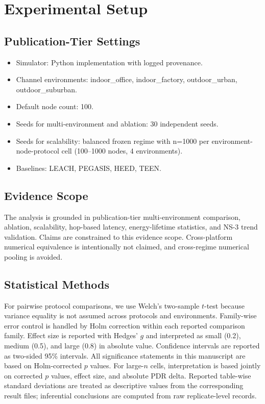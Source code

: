 \documentclass[sensors,article,submit,moreauthors,pdftex]{Definitions/mdpi}
\begin{document}
\section{Experimental Setup}
\subsection{Publication-Tier Settings}
\begin{itemize}
\item Simulator: Python implementation with logged provenance.
\item Channel environments: indoor\_office, indoor\_factory, outdoor\_urban, outdoor\_suburban.
\item Default node count: 100.
\item Seeds for multi-environment and ablation: 30 independent seeds.
\item Seeds for scalability: balanced frozen regime with n=1000 per environment-node-protocol cell (100--1000 nodes, 4 environments).
\item Baselines: LEACH, PEGASIS, HEED, TEEN.
\end{itemize}

\subsection{Evidence Scope}
The analysis is grounded in publication-tier multi-environment comparison, ablation, scalability, hop-based latency, energy-lifetime statistics, and NS-3 trend validation. Claims are constrained to this evidence scope. Cross-platform numerical equivalence is intentionally not claimed, and cross-regime numerical pooling is avoided.

\subsection{Statistical Methods}
For pairwise protocol comparisons, we use Welch's two-sample $t$-test because variance equality is not assumed across protocols and environments. Family-wise error control is handled by Holm correction within each reported comparison family. Effect size is reported with Hedges' $g$ and interpreted as small (0.2), medium (0.5), and large (0.8) in absolute value. Confidence intervals are reported as two-sided 95\% intervals. All significance statements in this manuscript are based on Holm-corrected $p$ values. For large-$n$ cells, interpretation is based jointly on corrected $p$ values, effect size, and absolute PDR delta. Reported table-wise standard deviations are treated as descriptive values from the corresponding result files; inferential conclusions are computed from raw replicate-level records.
\end{document}
